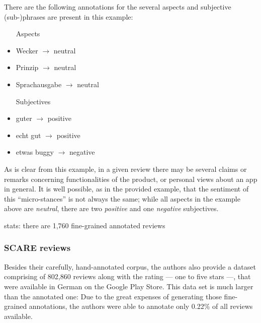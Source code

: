 There are the following annotations for the several aspects and subjective (sub-)phrases are present in this example:

\begin{multicols}{2}

\begin{itemize}
	\item [Aspects]
	\item Wecker $\rightarrow$ neutral
	\item Prinzip $\rightarrow$ neutral
	\item Sprachausgabe $\rightarrow$ neutral
\end{itemize}

\columnbreak

\begin{itemize}
	\item [Subjectives]
	\item guter $\rightarrow$ positive
	\item echt gut $\rightarrow$ positive
	\item etwas buggy $\rightarrow$ negative
\end{itemize}

\end{multicols}

As is clear from this example, in a given review there may be several claims or remarks concerning functionalities of the product, or personal views about an app in general.
It is well possible, as in the provided example, that the sentiment of this ``micro-stances'' is not always the same; while all aspects in the example above are \emph{neutral}, there are two \emph{positive} and one \emph{negative} subjectives.


stats: there are 1,760 fine-grained annotated reviews

\subsubsection{SCARE reviews}

Besides their carefully, hand-annotated corpus, the authors also provide a dataset comprising of 802,860 reviews along with the rating --- one to five stars ---, that were available in German on the Google Play Store.
This data set is much larger than the annotated one: Due to the great expenses of generating those fine-grained annotations, the authors were able to annotate only 0.22\% of all reviews available.


